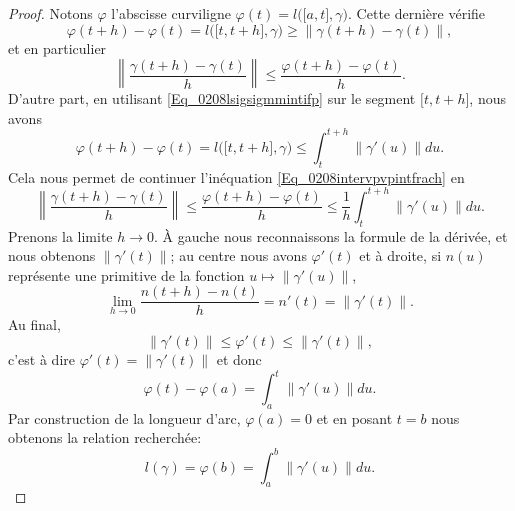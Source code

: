 \begin{proof}
    Notons $\varphi$ l'abscisse curviligne $\varphi(t)=l\big( \mathopen[ a , t \mathclose],\gamma \big)$. Cette dernière vérifie
    \begin{equation}
        \varphi(t+h)-\varphi(t)=l\big( \mathopen[ t , t+h \mathclose],\gamma \big)\geq \| \gamma(t+h)-\gamma(t) \|,
    \end{equation}
    et en particulier
    \begin{equation}     \label{Eq_0208intervpvpintfrach}
        \left\| \frac{ \gamma(t+h)-\gamma(t) }{ h } \right\|\leq \frac{ \varphi(t+h)-\varphi(t) }{ h }.
    \end{equation}
    D'autre part, en utilisant \eqref{Eq_0208lsigsigmmintifp} sur le segment $\mathopen[ t , t+h \mathclose]$, nous avons
    \begin{equation}
        \varphi(t+h)-\varphi(t)=l\big( \mathopen[ t , t+h \mathclose],\gamma \big)\leq\int_{t}^{t+h}\| \gamma'(u) \|du.
    \end{equation}
    Cela nous permet de continuer l'inéquation \eqref{Eq_0208intervpvpintfrach} en
    \begin{equation}
        \left\| \frac{ \gamma(t+h)-\gamma(t) }{ h } \right\|\leq\frac{ \varphi(t+h)-\varphi(t) }{ h }\leq\frac{1}{ h }\int_t^{t+h}\| \gamma'(u) \|du.
    \end{equation}
    Prenons la limite $h\to 0$. À gauche nous reconnaissons la formule de la dérivée, et nous obtenons $\| \gamma'(t) \|$; au centre nous avons $\varphi'(t)$ et à droite, si $n(u)$ représente une primitive de la fonction $u\mapsto\| \gamma'(u) \|$,
    \begin{equation}
        \lim_{h\to 0}\frac{ n(t+h)-n(t) }{ h }=n'(t)=\| \gamma'(t) \|.
    \end{equation}
    Au final, 
    \begin{equation}
        \| \gamma'(t) \|\leq \varphi'(t)\leq\| \gamma'(t) \|,
    \end{equation}
    c'est à dire $\varphi'(t)=\| \gamma'(t) \|$ et donc
    \begin{equation}
        \varphi(t)-\varphi(a)=\int_a^t\| \gamma'(u) \|du.
    \end{equation}
    Par construction de la longueur d'arc, $\varphi(a)=0$ et en posant $t=b$ nous obtenons la relation recherchée:
    \begin{equation}
        l(\gamma)=\varphi(b)=\int_a^b\| \gamma'(u) \|du.
    \end{equation}
\end{proof}

